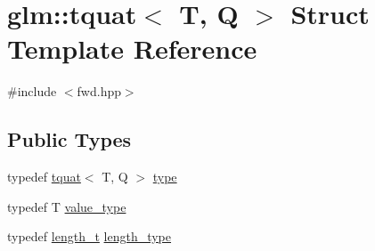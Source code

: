\hypertarget{structglm_1_1tquat}{}\section{glm\+:\+:tquat$<$ T, Q $>$ Struct Template Reference}
\label{structglm_1_1tquat}


{\ttfamily \#include $<$fwd.\+hpp$>$}

\subsection*{Public Types}
\begin{DoxyCompactItemize}
\item 
typedef \mbox{\hyperlink{structglm_1_1tquat}{tquat}}$<$ T, Q $>$ \mbox{\hyperlink{structglm_1_1tquat_ae9600f57e83d084305f1c801150fbd36}{type}}
\item 
typedef T \mbox{\hyperlink{structglm_1_1tquat_ac02efd34879e12e77f5143df3708b070}{value\+\_\+type}}
\item 
typedef \mbox{\hyperlink{namespaceglm_a090a0de2260835bee80e71a702492ed9}{length\+\_\+t}} \mbox{\hyperlink{structglm_1_1tquat_a6d9ab28781d7835b30216a996484c026}{length\+\_\+type}}
\end{DoxyCompactItemize}
